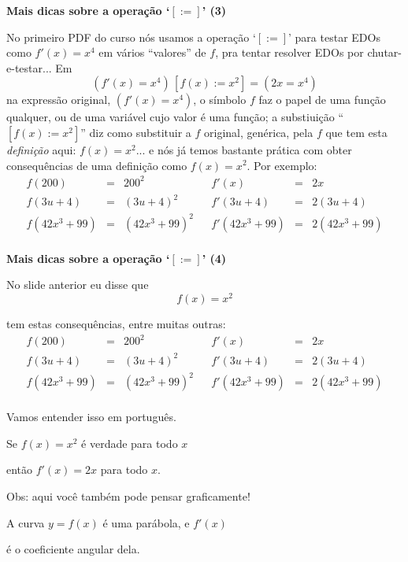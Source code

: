 \documentclass[oneside,12pt]{article}
\begin{document}
\newpage


{\bf Mais dicas sobre a operação `$[:=]$' (3)}

No primeiro PDF do curso nós usamos a operação `$[:=]$' para testar
EDOs como $f'(x)=x^4$ em vários ``valores'' de $f$, pra tentar
resolver EDOs por chutar-e-testar... Em
%
$$(f'(x)=x^4)\, [f(x):=x^2] = (2x = x^4)$$
%
na expressão original, $(f'(x)=x^4)$, o símbolo $f$ faz o papel de uma
função qualquer, ou de uma variável cujo valor é uma função; a
substiuição ``$[f(x):=x^2]$'' diz como substituir a $f$ original,
genérica, pela $f$ que tem esta {\sl definição} aqui: $f(x)=x^2$... e
nós já temos bastante prática com obter consequências de uma definição
como $f(x)=x^2$. Por exemplo:
%
$$\begin{array}{rclcrcl}
  f(200)  &=& 200^2            && f'(x) &=& 2x \\
  f(3u+4) &=& (3u+4)^2         && f'(3u+4) &=& 2(3u+4) \\
  f(42x^3+99) &=& (42x^3+99)^2 && f'(42x^3+99) &=& 2(42x^3+99) \\
  \end{array}
$$


\newpage

{\bf Mais dicas sobre a operação `$[:=]$' (4)}

No slide anterior eu disse que
%
$$f(x)=x^2$$

tem estas consequências, entre muitas outras:
%
$$\begin{array}{rclcrcl}
  f(200)  &=& 200^2            && f'(x) &=& 2x \\
  f(3u+4) &=& (3u+4)^2         && f'(3u+4) &=& 2(3u+4) \\
  f(42x^3+99) &=& (42x^3+99)^2 && f'(42x^3+99) &=& 2(42x^3+99) \\
  \end{array}
$$

Vamos entender isso em português.

Se $f(x)=x^2$ é verdade para todo $x$

então $f'(x)=2x$ para todo $x$.

Obs: aqui você também pode pensar graficamente!

A curva $y=f(x)$ é uma parábola, e $f'(x)$

é o coeficiente angular dela.

\newpage

\end{document}
